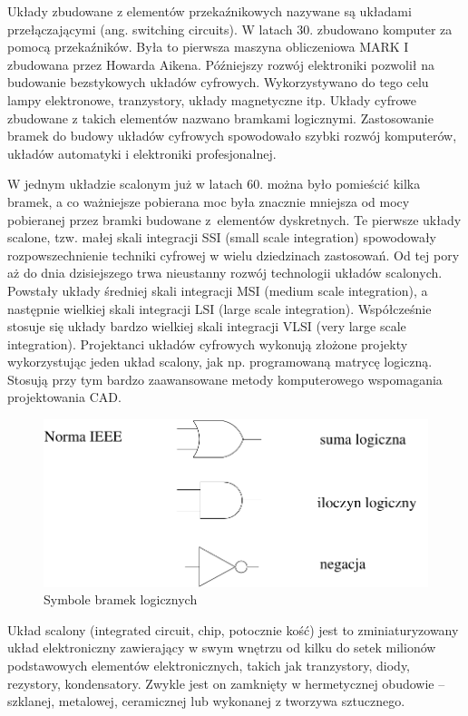 \documentclass[a4paper,11pt]{article}
\begin{document}
Układy zbudowane z elementów przekaźnikowych nazywane są układami przełączającymi (ang. switching circuits).  W latach 30. zbudowano komputer za pomocą przekaźników. Była to pierwsza maszyna obliczeniowa MARK I zbudowana przez Howarda Aikena. Późniejszy rozwój elektroniki pozwolił na budowanie bezstykowych układów cyfrowych. Wykorzystywano do tego celu lampy elektronowe, tranzystory, układy magnetyczne itp. Układy cyfrowe zbudowane z takich elementów nazwano bramkami logicznymi. Zastosowanie bramek do budowy układów cyfrowych spowodowało szybki rozwój komputerów, układów automatyki i elektroniki profesjonalnej.
 
W jednym układzie scalonym już w latach 60. można było pomieścić kilka bramek, a co ważniejsze pobierana moc była znacznie mniejsza od mocy pobieranej przez bramki budowane z~elementów dyskretnych. Te pierwsze układy scalone, tzw. małej skali integracji SSI (small scale integration) spowodowały rozpowszechnienie techniki cyfrowej w wielu dziedzinach zastosowań. Od tej pory aż do dnia dzisiejszego trwa nieustanny rozwój technologii układów scalonych. Powstały układy średniej skali integracji MSI (medium scale integration), a następnie wielkiej skali integracji LSI (large scale integration). Współcześnie stosuje się układy bardzo wielkiej skali integracji VLSI (very large scale integration). Projektanci układów cyfrowych wykonują złożone projekty wykorzystując jeden układ scalony, jak np. programowaną matrycę logiczną. Stosują przy tym bardzo zaawansowane metody komputerowego wspomagania projektowania CAD.  

\begin{figure}[!htb]
\centerline{\includegraphics[scale=0.6]{symbole-bramek.pdf}}
\caption{Symbole bramek logicznych}
\label{fig:symboleBramekLogicznych}
\end{figure}

Układ scalony (integrated circuit, chip, potocznie kość) jest to zminiaturyzowany układ elektroniczny zawierający w swym wnętrzu od kilku do setek milionów podstawowych elementów elektronicznych, takich jak tranzystory, diody, rezystory, kondensatory. Zwykle jest on zamknięty w hermetycznej obudowie -- szklanej, metalowej, ceramicznej lub wykonanej z tworzywa sztucznego.
 
\end{document}
